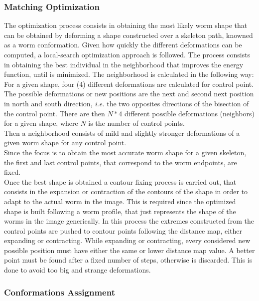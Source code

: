 \subsubsection*{Matching Optimization}

The optimization process consists in obtaining the most likely worm shape that can be
obtained by deforming a shape constructed over a skeleton path, knowned as a 
worm conformation. Given how quickly the different deformations can be computed,
a local-search optimization approach is followed. The process consists in obtaining the
best individual in the neighborhood that improves the energy function, until is 
minimized. The neighborhood is calculated in the following way:
For a given shape, four (4) different deformations are calculated for control point.
The possible deformations or new positions are the
next and second next position in north and south direction, \emph{i.e. }the two opposites
directions of the bisection of the control point.
There are then $N*4$ different possible deformations (neighbors) for a given shape,
where $N$ is the number of control points.\\ 
Then a neighborhood consists of mild and slightly stronger deformations of a given
worm shape for any control point.\\ Since the focus is to obtain the most accurate worm 
shape for a given skeleton, the
first and last control points, that correspond to the worm endpoints, are fixed.\\

Once the best shape is obtained a contour fixing process is carried out, that
consists in the expansion or contraction of the contours of the shape in order to adapt
to the actual worm in the image. This is required since the optimized shape is built 
following a worm profile, that just represents the shape of the worms in the image 
generically. In this process the extremes constructed from the control points are pushed
to contour points following the distance map, either expanding or contracting. While
expanding or contracting, every considered new possible position must have either the 
same or lower distance map value. A better point must be found after a fixed number
of steps, otherwise is discarded. This is done to avoid too big and strange deformations.

\subsubsection*{Conformations Assignment}

